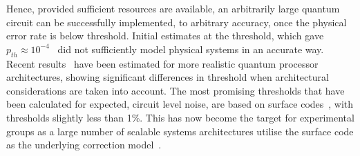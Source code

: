 Hence, provided sufficient resources are available, an arbitrarily large quantum circuit can be 
successfully implemented, to arbitrary accuracy, once the physical error rate is below threshold.  Initial estimates at the threshold, which gave $p_{th} \approx 10^{-4}$~\cite{bib:K97,bib:AB97,bib:G97+} did not sufficiently model physical systems in an accurate way.  Recent results~\cite{bib:SFH07,bib:SDT07,bib:SBFRYSGF06,bib:MCTBCCC04,bib:BSO05} have been estimated for more realistic quantum processor architectures, showing significant differences in threshold when architectural considerations are taken into account.  The most promising thresholds that have been calculated for expected, circuit level noise, are based on surface codes~\cite{bib:WFSH09,bib:WFH11,bib:FMMC12,bib:S14}, with thresholds slightly less than 1\%.  This has now become the target for experimental groups as a large number of scalable systems architectures utilise the surface code as the underlying correction model~\cite{bib:Gimeno-Segovia:2015aa,bib:Hill:2015aa,Lekitsch:2017aa,Nemoto:2014aa,Jones:2012aa,bib:Mukai_2020}.


